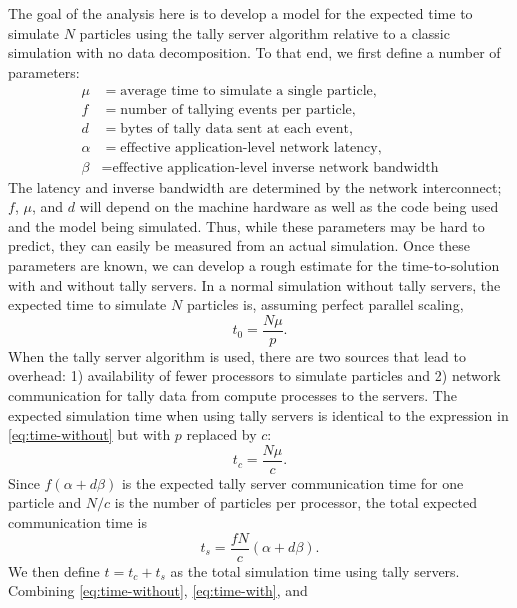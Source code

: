 \documentclass{snamc2013}
\begin{document}
The goal of the analysis here is to develop a model for the expected time to
simulate $N$ particles using the tally server algorithm relative to a classic
simulation with no data decomposition. To that end, we first define a number of
parameters:
\begin{align*}
  \mu &= \text{average time to simulate a single particle}, \\
  f &= \text{number of tallying events per particle}, \\
  d &= \text{bytes of tally data sent at each event}, \\
  \alpha &= \text{effective application-level network latency}, \\
  \beta &= \text{effective application-level inverse network bandwidth}
\end{align*}
The latency and inverse bandwidth are determined by the network interconnect;
$f$, $\mu$, and $d$ will depend on the machine hardware as well as the code
being used and the model being simulated. Thus, while these parameters may be
hard to predict, they can easily be measured from an actual simulation. Once
these parameters are known, we can develop a rough estimate for the
time-to-solution with and without tally servers. In a normal simulation without
tally servers, the expected time to simulate $N$ particles is, assuming perfect
parallel scaling,
\begin{equation}
  \label{eq:time-without}
  t_0 = \frac{N\mu}{p}.
\end{equation}
When the tally server algorithm is used, there are two sources that lead to
overhead: 1) availability of fewer processors to simulate particles and 2)
network communication for tally data from compute processes to the servers. The
expected simulation time when using tally servers is identical to the expression
in \autoref{eq:time-without} but with $p$ replaced by $c$:
\begin{equation}
  \label{eq:time-with}
  t_c = \frac{N\mu}{c}.
\end{equation}
Since $f(\alpha + d \beta)$ is the expected tally server communication time for
one particle and $N/c$ is the number of particles per processor, the total
expected communication time is
\begin{equation}
  \label{eq:time-send}
  t_s = \frac{fN}{c} \left ( \alpha + d\beta \right ).
\end{equation}
We then define $t = t_c + t_s$ as the total simulation time using tally
servers. Combining \autoref{eq:time-without}, \autoref{eq:time-with}, and
\end{document}

